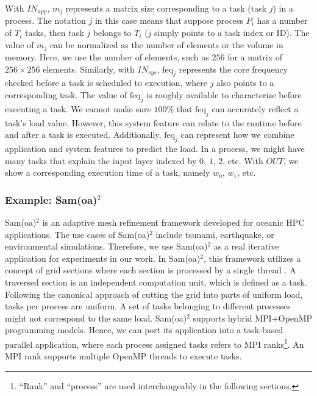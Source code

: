 With $IN_{app}$, $m_{j}$ represents a matrix size corresponding to a task (task $j$) in a process. The notation $j$ in this case means that suppose process $P_{i}$ has a number of $T_{i}$ tasks, then task $j$ belongs to $T_{i}$ ($j$ simply points to a task index or ID). The value of $m_{j}$ can be normalized as the number of elements or the volume in memory. Here, we use the number of elements, such as $256$ for a matrix of $256 \times 256$ elements. Similarly, with $IN_{sys}$, $\text{feq}_{j}$ represents the core frequency checked before a task is scheduled to execution, where $j$ also points to a corresponding task. The value of $\text{feq}_{j}$ is roughly available to characterize before executing a task. We cannot make sure $100\%$ that $\text{feq}_{j}$ can accurately reflect a task's load value. However, this system feature can relate to the runtime before and after a task is executed. Additionally, $\text{feq}_{j}$ can represent how we combine application and system features to predict the load. In a process, we might have many tasks that explain the input layer indexed by $0$, $1$, $2$, etc. With $OUT$, we show a corresponding execution time of a task, namely $w_{0}$, $w_{1}$, etc.\\

\subsubsection{Example: Sam(oa)$^2$}
\label{subsubsec:samoa-online-prediction}

Sam(oa)$^2$ is an adaptive mesh refinement framework developed for oceanic HPC applications. The use cases of Sam(oa)$^2$ include tsunami, earthquake, or environmental simulations. Therefore, we use Sam(oa)$^2$ as a real iterative application for experiments in our work. In Sam(oa)$^2$, this framework utilizes a concept of grid sections where each section is processed by a single thread \cite{Meister2016AMRSamoa}. A traversed section is an independent computation unit, which is defined as a task. Following the canonical approach of cutting the grid into parts of uniform load, tasks per process are uniform. A set of tasks belonging to different processes might not correspond to the same load. Sam(oa)$^2$ supports hybrid MPI+OpenMP programming models. Hence, we can port its application into a task-based parallel application, where each process assigned tasks refers to MPI ranks\footnote{``Rank'' and ``process'' are used interchangeably in the following sections.}. An MPI rank supports multiple OpenMP threads to execute tasks.\\

